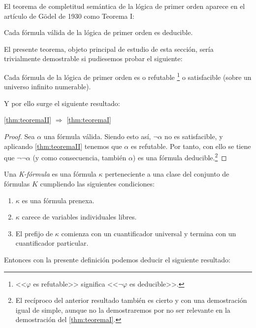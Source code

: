 El teorema de completitud semántica de la lógica de primer orden aparece en el artículo de Gödel de 1930 como Teorema I:

\begin{teorema}\label{thm:teoremaI}
    Cada fórmula válida de la lógica de primer orden es deducible.
\end{teorema}

El presente teorema, objeto principal de estudio de esta sección, sería trivialmente demostrable si pudiesemos probar
el siguiente:
\begin{teorema}\label{thm:teoremaII}
    Cada fórmula de la lógica de primer orden es o refutable
    \footnote{<<$\varphi$ es refutable>> significa <<$\lnot \varphi$ es deducible>>.} o satisfacible (sobre un universo infinito numerable).
\end{teorema}

Y por ello surge el siguiente resultado: 

\begin{proposicion}
    \autoref{thm:teoremaII} $\Rightarrow$ \autoref{thm:teoremaI}
\end{proposicion}
\begin{proof}
    Sea $\alpha$ una fórmula válida. Siendo esto así, $\lnot \alpha$ no es satisfacible, y aplicando \autoref{thm:teoremaII} 
    tenemos que $\alpha$ es refutable. Por tanto, con ello se tiene que $\lnot \lnot \alpha$ (y como consecuencia, también $\alpha$) es una fórmula
    deducible.\footnote{El recíproco del anterior resultado también es cierto y con una demostración igual de simple, aunque no la demostraremos por no ser relevante
    en la demostración del \autoref{thm:teoremaI}.}
\end{proof}

\begin{definicion}
    Una \textit{K-fórmula} es una fórmula $\kappa$ perteneciente a una clase del conjunto de fórmulas $K$ cumpliendo las siguientes condiciones:
    \begin{enumerate}
        \item $\kappa$ es una fórmula prenexa.
        \item $\kappa$ carece de variables individuales libres.
        \item El prefijo de $\kappa$ comienza con un cuantificador universal y termina con un cuantificador particular.
    \end{enumerate}
\end{definicion}

Entonces con la presente definición podemos deducir el siguiente resultado:

